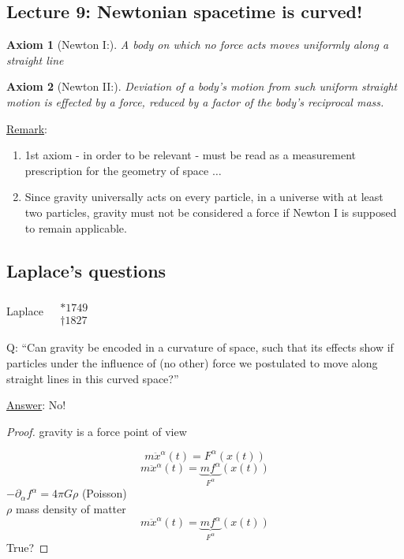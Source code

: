 \documentclass[10pt]{amsart}
\newtheorem{axiom}{Axiom}
\begin{document}
\begin{multicols*}{2}
	
	\section*{Lecture 9: Newtonian spacetime is curved!}
	
	\begin{axiom}[Newton I:]
		A body on which \emph{no} force acts moves uniformly along a straight line 
	\end{axiom}
	
	\begin{axiom}[Newton II:]
		Deviation of a body's motion from such uniform straight motion is effected by a force, reduced by a factor of the body's reciprocal mass.  
	\end{axiom}
	
	\underline{Remark}: \begin{enumerate}
		\item[(1)] 1st axiom - in order to be relevant - must be read as a measurement prescription for the geometry of space $\dots $
		\item[(2)] Since gravity universally acts on every particle, in a universe with at least two particles, gravity must not be considered a force if Newton I is supposed to remain applicable.  
	\end{enumerate}
	
	\subsection{Laplace's questions} Laplace $\begin{aligned}  & \quad \\ 
	& * 1749 \\
	& \dag 1827  \end{aligned}$
	
	Q: ``Can gravity be encoded in a curvature of space, such that its effects show if particles under the influence of (no other) force we postulated to move along straight lines in this curved space?''
	
	\underline{Answer}: No!
	
	\begin{proof}
		gravity is a force point of view
		
		
		\[
		m \ddot{x}^{\alpha}(t) = F^{\alpha}(x(t))
		\]
		\[
		m\ddot{x}^{\alpha}(t) = \underbrace{mf^{\alpha}}_{F^{\alpha}}(x(t))
		\]
		$-\partial_{\alpha} f^{\alpha} = 4\pi G\rho$ (Poisson) \\
		$\rho $ mass density of matter
		\[
		m \ddot{x}^{\alpha}(t)= \underbrace{mf^{\alpha}}_{F^{\alpha}}(x(t))
		\]
		True?
		

\end{proof}
\end{multicols*}
\end{document}
